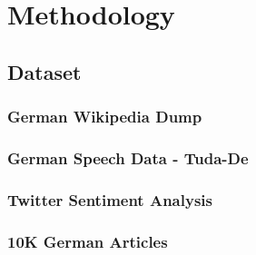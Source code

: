 \chapter{Methodology}
\label{chap:methodology}


\section{Dataset} 
\label{meth:s1}

\subsection{German Wikipedia Dump}
\label{meth:sub1}

\subsection{German Speech Data - Tuda-De}
\label{meth:sub2}

\subsection{Twitter Sentiment Analysis}
\label{meth:sub3}

\subsection{10K German Articles}
\label{meth:sub4}